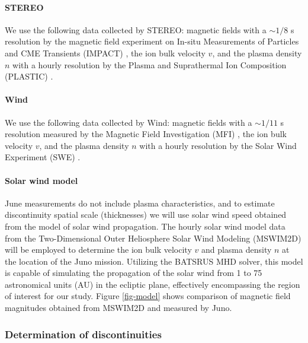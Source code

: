 \documentclass[
  letterpaper,
  DIV=11,
  numbers=noendperiod]{scrartcl}
\let\oldparagraph\paragraph
\renewcommand{\paragraph}[1]{\oldparagraph{#1}\mbox{}}
\begin{document}
\paragraph{STEREO}\label{stereo}

We use the following data collected by STEREO: magnetic ﬁelds with a
\(\sim1/8\) s resolution by the magnetic ﬁeld experiment
\citep{acuña2008} on In-situ Measurements of Particles and CME
Transients (IMPACT) \citep{luhmann2008}, the ion bulk velocity \(v\),
and the plasma density \(n\) with a hourly resolution by the Plasma and
Suprathermal Ion Composition (PLASTIC) \citep{galvin2008}.

\paragraph{Wind}\label{wind}

We use the following data collected by Wind: magnetic ﬁelds with a
\(\sim 1/11\) s resolution measured by the Magnetic Field Investigation
(MFI) \citep{lepping1995}, the ion bulk velocity \(v\), and the plasma
density \(n\) with a hourly resolution by the Solar Wind Experiment
(SWE) \citep{ogilvie1995}.

\paragraph{Solar wind model}\label{solar-wind-model}

June measurements do not include plasma characteristics, and to estimate
discontinuity spatial scale (thicknesses) we will use solar wind speed
obtained from the model of solar wind propagation. The hourly solar wind
model data from the Two-Dimensional Outer Heliosphere Solar Wind
Modeling (MSWIM2D) \citep{keebler2022} will be employed to determine the
ion bulk velocity \(v\) and plasma density \(n\) at the location of the
Juno mission. Utilizing the BATSRUS MHD solver, this model is capable of
simulating the propagation of the solar wind from 1 to 75 astronomical
units (AU) in the ecliptic plane, effectively encompassing the region of
interest for our study. Figure \ref{fig-model} shows comparison of
magnetic field magnitudes obtained from MSWIM2D and measured by Juno.

\subsubsection{Determination of
discontinuities}\label{determination-of-discontinuities}
\end{document}
